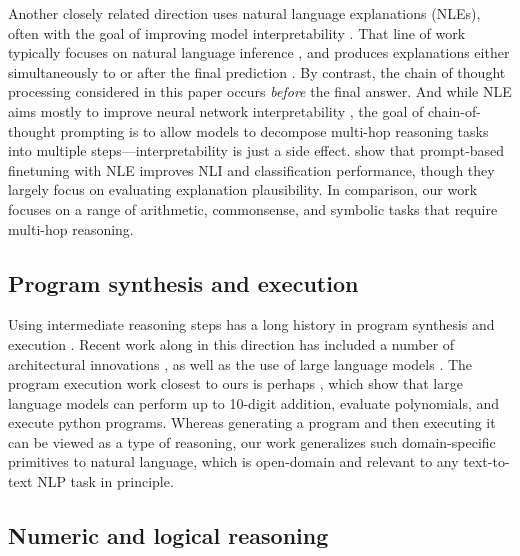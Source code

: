 \documentclass[]{article}
\theoremstyle{plain}
\theoremstyle{definition}
\theoremstyle{remark}
\begin{document}
Another closely related direction uses natural language explanations (NLEs), often with the goal of improving model interpretability \citep[][\textit{inter alia}]{zhou2020towards,wiegreffe2021teach}.
That line of work typically focuses on natural language inference \citep{camburu2018snli,yordanov2021few,bostrom-etal-2021-flexible}, and produces explanations either simultaneously to or after the final prediction \citep{narang2020wt5,majumder2021rationale,wiegreffe-etal-2021-measuring,wiegreffe2021reframing}.
By contrast, the chain of thought processing considered in this paper occurs \textit{before} the final answer.
And while NLE aims mostly to improve neural network interpretability \citep{rajagopal2021selfexplain}, the goal of chain-of-thought prompting is to allow models to decompose multi-hop reasoning tasks into multiple steps---interpretability is just a side effect.
\citet{marasovic2021few} show that prompt-based finetuning with NLE improves NLI and classification performance, though they largely focus on evaluating explanation plausibility.
In comparison, our work focuses on a range of arithmetic, commonsense, and symbolic tasks that require multi-hop reasoning.

\subsection{Program synthesis and execution}

Using intermediate reasoning steps has a long history in program synthesis and execution \citep[][\textit{inter alia}]{zaremba2014learning}.
Recent work along in this direction has included a number of architectural innovations \citep{cai2017making,dong2019neural,yan2020neural}, as well as the use of large language models \citep{chen2021evaluating,austin2021program}.
The program execution work closest to ours is perhaps \citet{nye2021show}, which show that large language models can perform up to 10-digit addition, evaluate polynomials, and execute python programs.
Whereas generating a program and then executing it can be viewed as a type of reasoning, our work generalizes such domain-specific primitives to natural language, which is open-domain and relevant to any text-to-text NLP task in principle.

\subsection{Numeric and logical reasoning}
\end{document}

